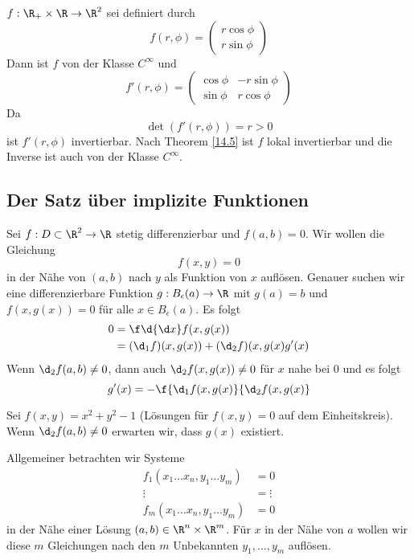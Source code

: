 \documentclass[a4paper,10pt]{scrartcl}
\begin{document}
\begin{ex*}
$f:\R_+\times \R \to \R^2$ sei definiert durch
\[
f(r,\phi) = \begin{pmatrix}r\cos \phi \\ r\sin \phi\end{pmatrix}
\]
Dann ist $f$ von der Klasse $C^\infty$ und
\[
f'(r,\phi) = \begin{pmatrix} \cos \phi & -r\sin \phi \\ \sin\phi & r\cos\phi\end{pmatrix}
\]
Da
\[
\det(f'(r,\phi)) = r > 0
\]
ist $f'(r,\phi)$ invertierbar.
Nach Theorem \ref{14.5} ist $f$ lokal invertierbar und die Inverse ist auch von der Klasse $C^\infty$.
\end{ex*}


\subsection{Der Satz über implizite Funktionen}

Sei $f:D\subset \R^2 \to \R$ stetig differenzierbar und $f(a,b)=0$.
Wir wollen die Gleichung
\[
f(x,y) = 0
\]
in der Nähe von $(a,b)$ nach $y$ als Funktion von $x$ auflösen.
Genauer suchen wir eine differenzierbare Funktion $g:B_\epsilon(a) \to \R$ mit $g(a)=b$ und $f(x,g(x))=0$ für alle $x\in B_\epsilon (a)$.
Es folgt
\begin{align*}
0 &= \f \d{\d x} f(x,g(x)) \\
&= (\d_1f)(x,g(x)) +(\d_2f)(x,g(x) g'(x)
\end{align*}
Wenn $\d_2f(a,b)\neq 0$, dann auch $\d_2f(x,g(x)) \neq 0$ für $x$ nahe bei $0$ und es folgt
\[
g'(x) = -\f {\d_1f(x,g(x)}{\d_2f(x,g(x)}
\]

\begin{ex*}
Sei $f(x,y) = x^2+y^2 - 1$ (Lösungen für $f(x,y)=0$ auf dem Einheitskreis).
Wenn $\d_2f(a,b)\neq 0$ erwarten wir, dass $g(x)$ existiert.
\end{ex*}

Allgemeiner betrachten wir Systeme
\begin{align*}
f_1(x_1\dotsc x_n, y_1\dotsc y_m) &= 0\\
\vdots \qquad &= \vdots \\
f_m(x_1\dotsc x_n, y_1\dotsc y_m) &= 0
\end{align*}
in der Nähe einer Lösung $(a,b)\in \R^n\times \R^m$.
Für $x$ in der Nähe von $a$ wollen wir diese $m$ Gleichungen nach den $m$ Unbekannten $y_1,\dotsc, y_m$ auflösen.
\end{document}
